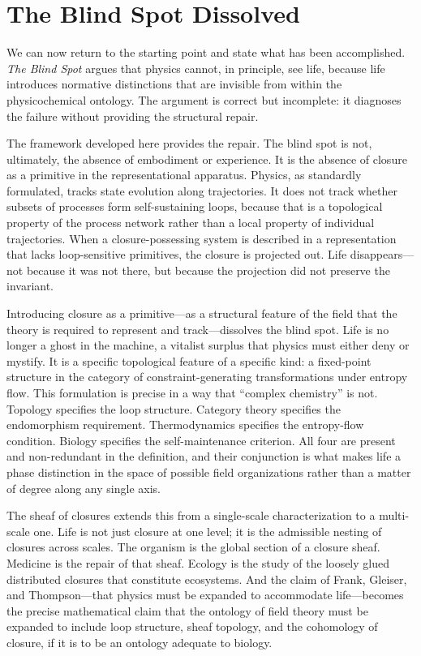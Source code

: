 \documentclass[11pt, a4paper]{article}
\theoremstyle{plain}
\theoremstyle{definition}
\theoremstyle{remark}
\begin{document}
\section{The Blind Spot Dissolved}

We can now return to the starting point and state what has been accomplished. \emph{The Blind Spot} argues that physics cannot, in principle, see life, because life introduces normative distinctions that are invisible from within the physicochemical ontology. The argument is correct but incomplete: it diagnoses the failure without providing the structural repair.

The framework developed here provides the repair. The blind spot is not, ultimately, the absence of embodiment or experience. It is the absence of closure as a primitive in the representational apparatus. Physics, as standardly formulated, tracks state evolution along trajectories. It does not track whether subsets of processes form self-sustaining loops, because that is a topological property of the process network rather than a local property of individual trajectories. When a closure-possessing system is described in a representation that lacks loop-sensitive primitives, the closure is projected out. Life disappears---not because it was not there, but because the projection did not preserve the invariant.

Introducing closure as a primitive---as a structural feature of the field that the theory is required to represent and track---dissolves the blind spot. Life is no longer a ghost in the machine, a vitalist surplus that physics must either deny or mystify. It is a specific topological feature of a specific kind: a fixed-point structure in the category of constraint-generating transformations under entropy flow. This formulation is precise in a way that ``complex chemistry'' is not. Topology specifies the loop structure. Category theory specifies the endomorphism requirement. Thermodynamics specifies the entropy-flow condition. Biology specifies the self-maintenance criterion. All four are present and non-redundant in the definition, and their conjunction is what makes life a phase distinction in the space of possible field organizations rather than a matter of degree along any single axis.

The sheaf of closures extends this from a single-scale characterization to a multi-scale one. Life is not just closure at one level; it is the admissible nesting of closures across scales. The organism is the global section of a closure sheaf. Medicine is the repair of that sheaf. Ecology is the study of the loosely glued distributed closures that constitute ecosystems. And the claim of Frank, Gleiser, and Thompson---that physics must be expanded to accommodate life---becomes the precise mathematical claim that the ontology of field theory must be expanded to include loop structure, sheaf topology, and the cohomology of closure, if it is to be an ontology adequate to biology.
\end{document}
